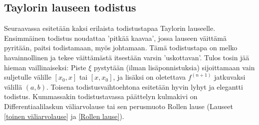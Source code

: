 \subsection{Taylorin lauseen todistus}

Seuraavassa esitetään kaksi erilaista todistustapaa Taylorin lauseelle. Ensimmäinen todistus 
noudattaa 'pitkää kaavaa', jossa lauseen väittämä pyritään, paitsi todistamaan, myös
johtamaan. Tämä todistustapa on melko havainnollinen ja tekee väittämästä itsestään varsin
'uskottavan'. Tulos tosin jää hieman vaillinaiseksi: Piste $\xi$ pystytään (ilman
lisäponnistuksia) sijoittamaan vain suljetulle välille $[x_0,x]$ tai $[x,x_0]$, ja lisäksi
on oletettava $f^{(n+1)}$ jatkuvaksi välillä $(a,b)$. Toisena todistusvaihtoehtona esitetään
hyvin lyhyt ja elegantti todistus. Kummassakin todistustavassa päättelyn kulmakivi on
Differentiaalilaskun väliarvolause tai sen perusmuoto Rollen lause
(Lauseet \ref{toinen väliarvolause} ja \ref{Rollen lause}).

